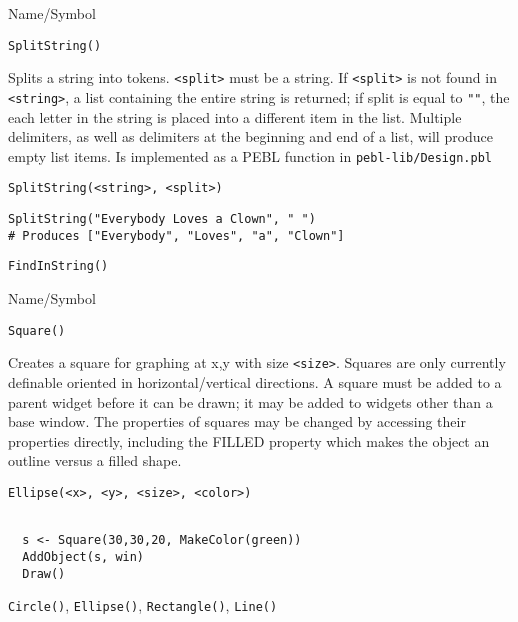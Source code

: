 \rl


\begin{desc}{Name/Symbol}
\item[Name/Symbol]  	\verb+SplitString()+

\item[Description]	Splits a string into tokens. \verb+<split>+ must be a string. If 
		\verb+<split>+ is not found in \verb+<string>+, a list containing the entire 
		string is returned; if split is equal to \verb+""+, the each letter 
		in the string is placed into a different item in the list.  
		Multiple delimiters, as well as delimiters at the beginning 
		and end of a list, will produce empty list items. 
		Is implemented as a PEBL function in \texttt{pebl-lib/Design.pbl}

\item[Usage]
\begin{verbatim}
SplitString(<string>, <split>)
\end{verbatim}

\item[Example]      	
\begin{verbatim}
SplitString("Everybody Loves a Clown", " ") 
# Produces ["Everybody", "Loves", "a", "Clown"]
\end{verbatim}

\item[See Also]     	\verb+FindInString()+
\end{desc}

\rl




\begin{desc}{Name/Symbol}
\item[Name/Symbol]	\verb+Square()+
  
\item[Description]	Creates a square for graphing at x,y with size
  \verb+<size>+. Squares are only currently definable oriented in
  horizontal/vertical directions.  A square  must be added
  to a parent widget before it can be drawn; it may be added to
  widgets other than a base window.  The properties of squares may be
  changed by accessing their properties directly, including the FILLED
  property which makes the object an outline versus a filled shape.

\item[Usage]
\begin{verbatim}
Ellipse(<x>, <y>, <size>, <color>)
\end{verbatim}

\item[Example]	
\begin{verbatim}
  
  s <- Square(30,30,20, MakeColor(green))
  AddObject(s, win)
  Draw()

\end{verbatim}
\item[See Also]	 \verb+Circle()+, \verb+Ellipse()+, \verb+Rectangle()+, \verb+Line()+
\end{desc}

